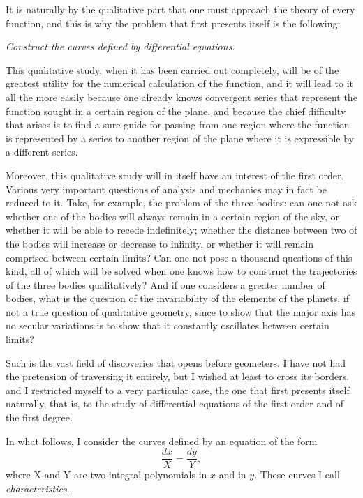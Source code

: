 \documentclass[11pt]{article}
\begin{document}
It is naturally by the qualitative part that one must approach the theory of every function, and this is why the problem that first presents itself is the following:

\begin{center}
\emph{Construct the curves defined by differential equations.}
\end{center}

This qualitative study, when it has been carried out completely, will be of the greatest utility for the numerical calculation of the function, and it will lead to it all the more easily because one already knows convergent series that represent the function sought in a certain region of the plane, and because the chief difficulty that arises is to find a sure guide for passing from one region where the function is represented by a series to another region of the plane where it is expressible by a different series.

Moreover, this qualitative study will in itself have an interest of the first order. Various very important questions of analysis and mechanics may in fact be reduced to it. Take, for example, the problem of the three bodies: can one not ask whether one of the bodies will always remain in a certain region of the sky, or whether it will be able to recede indefinitely; whether the distance between two of the bodies will increase or decrease to infinity, or whether it will remain comprised between certain limits? Can one not pose a thousand questions of this kind, all of which will be solved when one knows how to construct the trajectories of the three bodies qualitatively? And if one considers a greater number of bodies, what is the question of the invariability of the elements of the planets, if not a true question of qualitative geometry, since to show that the major axis has no secular variations is to show that it constantly oscillates between certain limits?

Such is the vast field of discoveries that opens before geometers. I have not had the pretension of traversing it entirely, but I wished at least to cross its borders, and I restricted myself to a very particular case, the one that first presents itself naturally, that is, to the study of differential equations of the first order and of the first degree.

In what follows, I consider the curves defined by an equation of the form
\[
\frac{dx}{X}=\frac{dy}{Y},
\]
where X and Y are two integral polynomials in $x$ and in $y$. These curves I call \emph{characteristics}.
\end{document}
